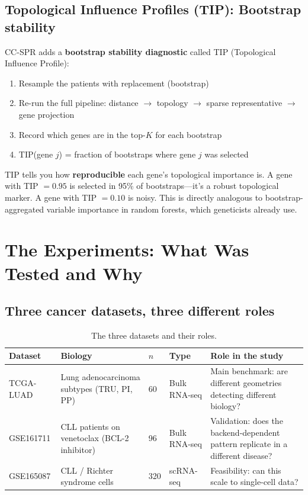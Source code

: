 \documentclass[11pt]{article}
\begin{document}
\subsection{Topological Influence Profiles (TIP): Bootstrap stability}

CC-SPR adds a \textbf{bootstrap stability diagnostic} called TIP (Topological Influence Profile):

\begin{enumerate}
    \item Resample the patients with replacement (bootstrap)
    \item Re-run the full pipeline: distance $\to$ topology $\to$ sparse representative $\to$ gene projection
    \item Record which genes are in the top-$K$ for each bootstrap
    \item TIP(gene $j$) = fraction of bootstraps where gene $j$ was selected
\end{enumerate}

\begin{takeaway}
TIP tells you how \textbf{reproducible} each gene's topological importance is. A gene with TIP $= 0.95$ is selected in 95\% of bootstraps---it's a robust topological marker. A gene with TIP $= 0.10$ is noisy. This is directly analogous to bootstrap-aggregated variable importance in random forests, which geneticists already use.
\end{takeaway}

\section{The Experiments: What Was Tested and Why}
\label{sec:experiments}

\subsection{Three cancer datasets, three different roles}

\begin{table}[h]
\centering
\small
\begin{tabular}{p{2.5cm}p{2.5cm}p{1cm}p{1.5cm}p{4cm}}
\toprule
\textbf{Dataset} & \textbf{Biology} & $n$ & \textbf{Type} & \textbf{Role in the study} \\
\midrule
TCGA-LUAD & Lung adenocarcinoma subtypes (TRU, PI, PP) & 60 & Bulk RNA-seq & Main benchmark: are different geometries detecting different biology? \\
\midrule
GSE161711 & CLL patients on venetoclax (BCL-2 inhibitor) & 96 & Bulk RNA-seq & Validation: does the backend-dependent pattern replicate in a different disease? \\
\midrule
GSE165087 & CLL / Richter syndrome cells & 320 & scRNA-seq & Feasibility: can this scale to single-cell data? \\
\bottomrule
\end{tabular}
\caption{The three datasets and their roles.}
\end{table}
\end{document}
